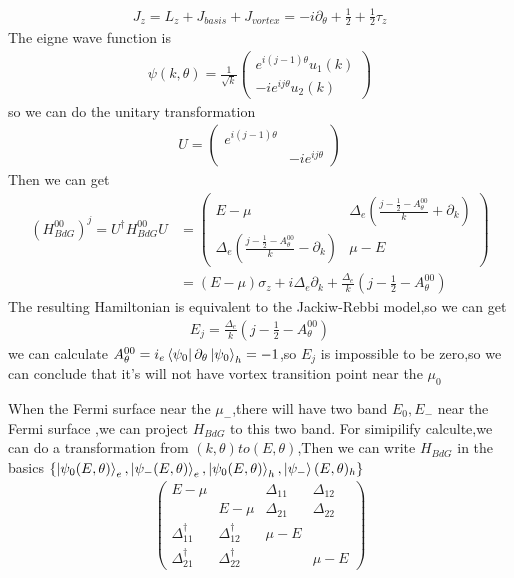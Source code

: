 \documentclass[4pt]{article}
\begin{document}
	\begin{align}
		J_z=L_z+J_{basis}+J_{vortex}=-i\partial_{\theta}+\frac{1}{2}+\frac{1}{2}\tau_z
	\end{align}
	The eigne wave function is
	\begin{align}
			\psi(k,\theta)=\frac{1}{\sqrt{k}}
			\begin{pmatrix}
				e^{i(j-1)\theta }u_1(k)\\
				-ie^{ij\theta}u_2(k)
			\end{pmatrix}
	\end{align}
	so we can do the unitary transformation
	\begin{align}
		U=\begin{pmatrix}
			e^{i(j-1)\theta}&\\
			&-ie^{ij\theta}
		\end{pmatrix}
	\end{align}
	Then we can get
	\begin{align}
		(H_{BdG}^{00})^j=U^{\dagger}H_{BdG}^{00}U
		&=\begin{pmatrix}
			E-\mu &\Delta_e(\frac{j-\frac{1}{2}-A_{\theta}^{00}}{k}+\partial_k)\\
			\Delta_e(\frac{j-\frac{1}{2}-A_{\theta}^{00}}{k}-\partial_k) &\mu-E
		\end{pmatrix}\\
	&=(E-\mu)\sigma_z+i\Delta_e\partial_k+\frac{\Delta_e}{k}(j-\frac{1}{2}-A_{\theta}^{00})
	\end{align}
The resulting Hamiltonian is equivalent to the
Jackiw-Rebbi model,so we can get 
	\begin{align}
		E_j=\frac{\Delta_e}{k}(j-\frac{1}{2}-A_{\theta}^{00})
	\end{align}
we can calculate $A_{\theta}^{00}=i_e\bra{\psi_0}\partial_{\theta}\ket{\psi_0}_h=-1$,so $E_j$ is impossible to be zero,so we can conclude that it's will not have vortex transition point near the $\mu_0$
\par 
When the Fermi surface near the $\mu_{-}$,there will have two band $E_0,E_{-}$ near the Fermi surface ,we can project $H_{BdG}$ to this two band.
For simipilify calculte,we can do a transformation from $(k,\theta) to (E,\theta)$,Then we can write $H_{BdG}$ in the basics $\{\ket{\psi_0(E,\theta)}_e,\ket{\psi_{-}(E,\theta)}_e,\ket{\psi_0(E,\theta)}_h,\ket{\psi_{-}}(E,\theta)_h\}$
\begin{align}
	\begin{pmatrix}
		E-\mu &&\Delta_{11} &\Delta_{12}\\
		&E-\mu&\Delta_{21} &\Delta_{22}\\
		\Delta_{11}^{\dagger}&\Delta_{12}^{\dagger}&\mu-E&\\
		\Delta_{21}^{\dagger}&\Delta_{22}^{\dagger}&&\mu-E
	\end{pmatrix}
\end{align}
\end{document}
